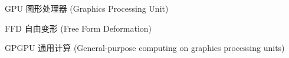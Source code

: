 \begin{denotation}

\item[GPU] 图形处理器 (Graphics Processing Unit)
\item[FFD] 自由变形 (Free Form Deformation)
\item[GPGPU] 通用计算 (General-purpose computing on graphics processing units)

\end{denotation}
